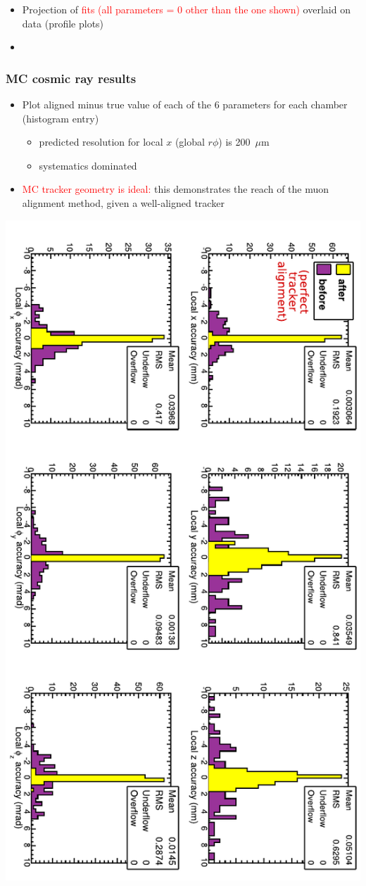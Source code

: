 \documentclass[compress]{beamer}
\begin{document}
\begin{frame}
\begin{columns}
\end{columns}

\begin{itemize}
\item Projection of \textcolor{red}{fits (all parameters = 0 other than the one shown)} overlaid on {\it {}} data (profile plots)
\item {}
\end{itemize}
\end{frame}

\begin{frame}
\frametitle{MC cosmic ray results}

\begin{itemize}
\item Plot aligned minus true value of each of the 6 parameters for each chamber (histogram entry)
\begin{itemize}
\item predicted resolution for local $x$ (global $r\phi$) is 200~$\mu$m
\item systematics dominated
\end{itemize}
\item \textcolor{red}{MC tracker geometry is ideal:} this demonstrates
  the reach of the muon alignment method, given a well-aligned tracker
\end{itemize}

\begin{center}
\includegraphics[height=0.9\linewidth, angle=90]{hip_MC_simple2.pdf}
\end{center}
\end{frame}
\end{document}
